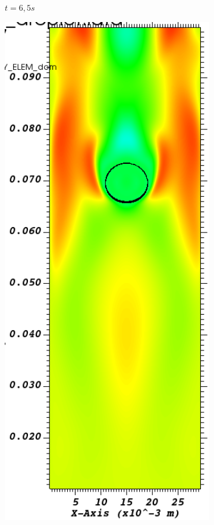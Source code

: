 \begin{figure}[H]
\begin{subfigure}[ht!]{0.18\textwidth}
		\caption{$t=6,5s$}
	\end{subfigure}
	\begin{subfigure}[ht!]{0.18\textwidth}
		\centering
		\includegraphics[width=1\textwidth]{fig_plateau_vitesse2/visit0014.png}

\end{subfigure}
\end{figure}
